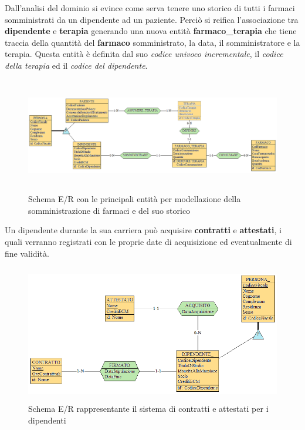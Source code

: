 \documentclass[a4paper, 12pt]{report}
\begin{document}
\noindent
Dall'analisi del dominio si evince come serva tenere uno storico di tutti i farmaci somministrati
da un dipendente ad un paziente. Perciò si reifica l'associazione tra \textbf{dipendente} e \textbf{terapia} generando
una nuova entità \textbf{farmaco\_terapia} che tiene traccia della quantità del \textbf{farmaco} somministrato, la data, 
il somministratore e la terapia. Questa entità è definita dal suo \textit{codice univoco incrementale}, il \textit{codice della terapia} ed 
il \textit{codice del dipendente}.

\begin{figure}[H]
        \centering
        \includegraphics[height=5cm]{img/dipendentePazienteERPreReif.png}
        \caption{Schema E/R con le principali entità per modellazione della somministrazione di farmaci e del suo storico}
\end{figure}

\noindent
Un dipendente durante la sua carriera può acquisire \textbf{contratti} e \textbf{attestati}, i quali verranno registrati con le proprie date
di acquisizione ed eventualmente di fine validità.

\begin{figure}[H]
        \centering
        \includegraphics[height=6cm]{img/dipendenteContrattiPreReif.png}
        \caption{Schema E/R rappresentante il sistema di contratti e attestati per i dipendenti}
\end{figure}
\end{document}
